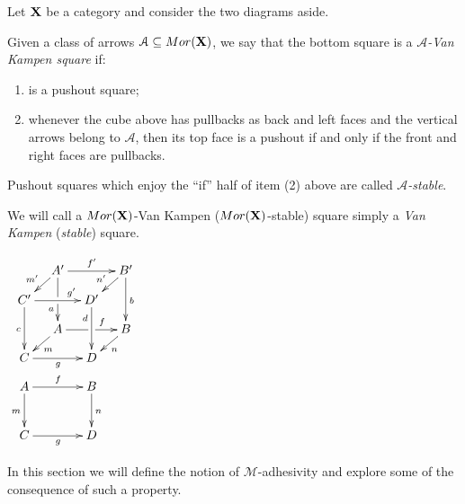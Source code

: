 \documentclass[a4paper,UKenglish,cleveref,pdftex, thm-restate,numberwithinsect]{lipics}
\newcommand{\mor}{\mathsf{Mor}}
\def\A{\textbf {\textup{A}}}
\def\C{\textbf {\textup{C}}}
\def\X{\textbf {\textup{X}}}
\begin{document}
\noindent 
\parbox{10cm}{
  \begin{definition}
    Let $\X$ be a category and consider the two diagrams aside.

    \hspace{15pt}
    Given  a class of arrows $\mathcal{A}\subseteq \mor(\X)$, we say that the bottom square
    is a \emph{$\mathcal{A}$-Van Kampen square} if:
	\begin{enumerate}
		\item is a pushout square;
		\item 	whenever the cube above has pullbacks as back and left faces and the vertical arrows belong to $\mathcal{A}$, then its top face is a pushout if and only if the front and right faces are pullbacks.
	\end{enumerate}
	Pushout squares which enjoy the ``if'' half of item (2) above are called \emph{$\mathcal{A}$-stable}. 
	
We will call a $\mor(\X)$-Van Kampen ($\mor(\X)$-stable) square simply a \emph{Van Kampen} (\emph{stable}) square.
\end{definition}}
\parbox{2cm}{$\xymatrix@C=10pt@R=10pt{&A'\ar[dd]|\hole_(.65){a}\ar[rr]^{f'} \ar[dl]_{m'} && B' \ar[dd]^{b} \ar[dl]_{n'} \\ C'  \ar[dd]_{c}\ar[rr]^(.7){g'} & & D' \ar[dd]_(.3){d}\\&A\ar[rr]|\hole^(.65){f} \ar[dl]^{m} && B \ar[dl]^{n} \\C \ar[rr]_{g} & & D \\A \ar[dd]_{m}\ar[rr]^{f}&&B\ar[dd]^{n}\\ \\C\ar[rr]_{g} &&D}$ }


In this section we will define the notion of $\mathcal{M}$-adhesivity \cite{azzi2019essence,ehrig2012,ehrig2014adhesive,heindel2009category,lack2005adhesive} and explore some of the consequence of such a property. 
\end{document}

